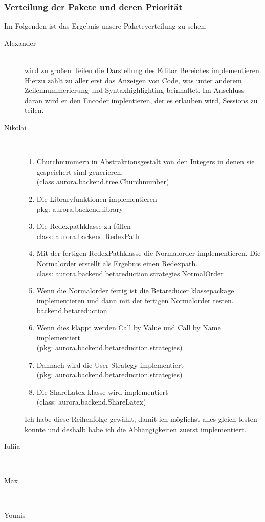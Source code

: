 \documentclass[parskip=full,11pt,twoside]{scrartcl}
\begin{document}
\subsubsection{Verteilung der Pakete und deren Priorität}
Im Folgenden ist das Ergebnis unsere Paketeverteilung zu sehen.
\begin{description}


    \item [Alexander]\hfill \\
      wird zu großen Teilen die Darstellung des Editor Bereiches implementieren. 
        Hierzu zählt zu aller erst das Anzeigen von Code, was unter anderem Zeilennummerierung und Syntaxhighlighting beinhaltet.
        Im Anschluss daran wird er den Encoder implentieren, der es erlauben wird, Sessions zu teilen.
    \item [Nikolai]\hfill \\
    \begin{enumerate}
    \item Churchnummern in Abstraktionsgestalt von den Integers in denen sie gespeichert sind generieren. \\(class aurora.backend.tree.Churchnumber)
    \item  Die Libraryfunktionen implementieren \\pkg: aurora.backend.library
    \item Die Redexpathklasse zu füllen \\class: aurora.backend.RedexPath
    \item Mit der fertigen RedexPathklasse die Normalorder implementieren. Die Normalorder erstellt als Ergebnis einen Redexpath. \\class: aurora.backend.betareduction.strategies.NormalOrder
    \item Wenn die Normalorder fertig ist die Betareducer klassepackage implementieren und dann mit der fertigen Normalorder testen. backend.betareduction
    \item Wenn dies klappt werden Call by Value und Call by Name implementiert  \\(pkg: aurora.backend.betareduction.strategies)
\item Dannach wird die User Strategy implementiert \\(pkg: aurora.backend.betareduction.strategies)

\item Die ShareLatex klasse wird implementiert \\(class: aurora.backend.ShareLatex)
    \end{enumerate}
Ich habe diese Reihenfolge gewählt, damit ich möglichst alles gleich testen konnte und deshalb habe ich die Abhängigkeiten zuerst implementiert.
    \item [Iuliia]\hfill \\
    \item [Max]\hfill \\
    \item [Younis]\hfill \\


\end{description}
\end{document}
